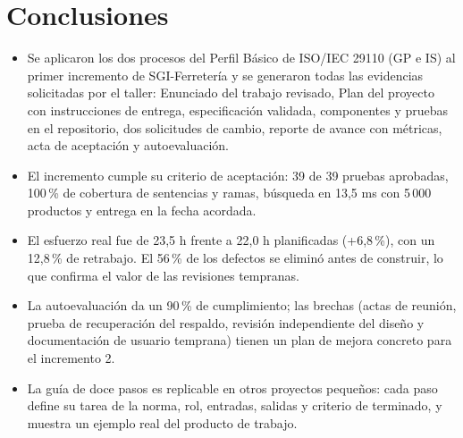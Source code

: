 \documentclass[11pt,a4paper]{article}
\begin{document}
\section{Conclusiones}
\begin{itemize}
  \item Se aplicaron los dos procesos del Perfil Básico de ISO/IEC 29110 (GP e IS) al primer incremento de SGI-Ferretería y se generaron todas las evidencias solicitadas por el taller: Enunciado del trabajo revisado, Plan del proyecto con instrucciones de entrega, especificación validada, componentes y pruebas en el repositorio, dos solicitudes de cambio, reporte de avance con métricas, acta de aceptación y autoevaluación.
  \item El incremento cumple su criterio de aceptación: 39 de 39 pruebas aprobadas, 100\,\% de cobertura de sentencias y ramas, búsqueda en 13,5 ms con 5\,000 productos y entrega en la fecha acordada.
  \item El esfuerzo real fue de 23,5 h frente a 22,0 h planificadas (+6,8\,\%), con un 12,8\,\% de retrabajo. El 56\,\% de los defectos se eliminó antes de construir, lo que confirma el valor de las revisiones tempranas.
  \item La autoevaluación da un 90\,\% de cumplimiento; las brechas (actas de reunión, prueba de recuperación del respaldo, revisión independiente del diseño y documentación de usuario temprana) tienen un plan de mejora concreto para el incremento 2.
  \item La guía de doce pasos es replicable en otros proyectos pequeños: cada paso define su tarea de la norma, rol, entradas, salidas y criterio de terminado, y muestra un ejemplo real del producto de trabajo.
\end{itemize}
\end{document}
